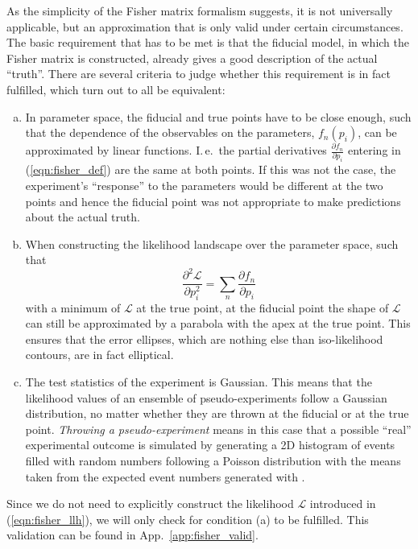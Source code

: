As the simplicity of the Fisher matrix formalism suggests, it is not
universally applicable, but an approximation that is only valid under certain
circumstances. The basic requirement that has to be met is that the fiducial
model, in which the Fisher matrix is constructed, already gives a good
description of the actual ``truth''. There are several criteria to judge
whether this requirement is in fact fulfilled, which turn out to all be
equivalent:
\begin{enumerate}[(a)]
 \item In parameter space, the fiducial and true points have to be close
  enough, such that the dependence of the observables on the parameters,
  $f_n(p_i)$, can be approximated by linear functions. I.\,e.\ the partial
  derivatives $\frac{\partial f_n}{\partial p_i}$ entering in
  (\ref{eqn:fisher_def}) are the same at both points. If this was not the case,
  the experiment's ``response'' to the parameters would be different at the two
  points and hence the fiducial point was not appropriate to make predictions
  about the actual truth.
 \item When constructing the likelihood landscape over the parameter space, such
  that
  \begin{equation}
   \frac{\partial^2\mathcal{L}}{\partial p_i^2}
     = \sum_n \frac{\partial f_n}{\partial p_i}
   \label{eqn:fisher_llh}
  \end{equation}
  with a minimum of $\mathcal{L}$ at the true point, at the fiducial point the
  shape of $\mathcal{L}$ can still be approximated by a parabola with the apex
  at the true point. This ensures that the error ellipses, which are nothing
  else than iso-likelihood contours, are in fact elliptical.
 \item The test statistics of the experiment is Gaussian. This means that the
  likelihood values of an ensemble of pseudo-experiments follow a Gaussian
  distribution, no matter whether they are thrown at the fiducial or at the true
  point. \emph{Throwing a pseudo-experiment} means in this case that
  a possible ``real'' experimental outcome is simulated by generating a 2D
  histogram of events filled with random numbers following a Poisson
  distribution with the means taken from the expected event numbers generated
  with \papa.
\end{enumerate}
Since we do not need to explicitly construct the likelihood $\mathcal{L}$
introduced in (\ref{eqn:fisher_llh}), we will only check for condition (a) to
be fulfilled. This validation can be found in App.~\ref{app:fisher_valid}.

